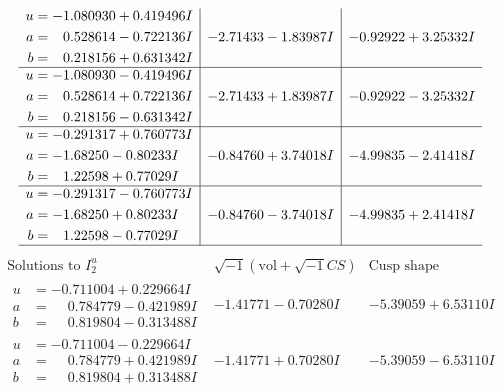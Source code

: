 \documentclass[1p]{elsarticle_modified}
\theoremstyle{definition}
\newcommand{\I}{\sqrt{-1}}
\begin{document}
$$\begin{array}{c|c|c}
\begin{aligned}
u &= -1.080930 + 0.419496 I \\
a &= \phantom{-}0.528614 - 0.722136 I \\
b &= \phantom{-}0.218156 + 0.631342 I\end{aligned}
 & -2.71433 - 1.83987 I & -0.92922 + 3.25332 I \\ \hline\begin{aligned}
u &= -1.080930 - 0.419496 I \\
a &= \phantom{-}0.528614 + 0.722136 I \\
b &= \phantom{-}0.218156 - 0.631342 I\end{aligned}
 & -2.71433 + 1.83987 I & -0.92922 - 3.25332 I \\ \hline\begin{aligned}
u &= -0.291317 + 0.760773 I \\
a &= -1.68250 - 0.80233 I \\
b &= \phantom{-}1.22598 + 0.77029 I\end{aligned}
 & -0.84760 + 3.74018 I & -4.99835 - 2.41418 I \\ \hline\begin{aligned}
u &= -0.291317 - 0.760773 I \\
a &= -1.68250 + 0.80233 I \\
b &= \phantom{-}1.22598 - 0.77029 I\end{aligned}
 & -0.84760 - 3.74018 I & -4.99835 + 2.41418 I\\
 \hline 
 \end{array}$$\newpage$$\begin{array}{c|c|c}  
\text{Solutions to }I^u_{2}& \I (\text{vol} + \sqrt{-1}CS) & \text{Cusp shape}\\
 \hline 
\begin{aligned}
u &= -0.711004 + 0.229664 I \\
a &= \phantom{-}0.784779 - 0.421989 I \\
b &= \phantom{-}0.819804 - 0.313488 I\end{aligned}
 & -1.41771 - 0.70280 I & -5.39059 + 6.53110 I \\ \hline\begin{aligned}
u &= -0.711004 - 0.229664 I \\
a &= \phantom{-}0.784779 + 0.421989 I \\
b &= \phantom{-}0.819804 + 0.313488 I\end{aligned}
 & -1.41771 + 0.70280 I & -5.39059 - 6.53110 I \\ \hline\begin{aligned}

\end{aligned}
\end{array}$$
\end{document}
